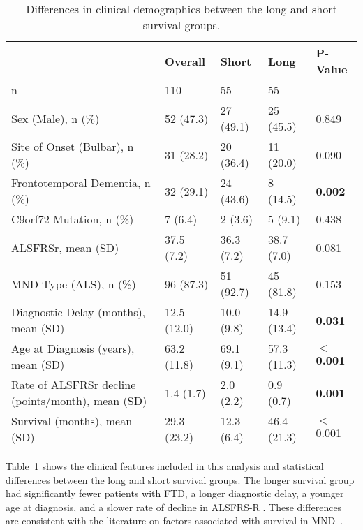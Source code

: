 \begin{table}
    \centering
    \label{tab:clinical_demographics}
    \caption{Differences in clinical demographics between the long and short survival groups.}
    \begin{tabular}{|p{5cm}|llll|}
    \hline
                                                        & \textbf{Overall}     & \textbf{Short}        & \textbf{Long}         & \textbf{P-Value}   \\
    \hline
     n                                                  & 110         & 55         & 55          &           \\ \hline
     Sex (Male), n (\%)                                     & 52 (47.3)   & 27 (49.1)  & 25 (45.5)   & 0.849     \\ \hline
     Site of Onset (Bulbar), n (\%)                          & 31 (28.2)   & 20 (36.4)  & 11 (20.0)  & 0.090     \\\hline
     Frontotemporal Dementia, n (\%)                       & 32 (29.1)   & 24 (43.6)  & 8 (14.5)   & \textbf{0.002}     \\\hline
     C9orf72 Mutation, n (\%)                               & 7 (6.4)     & 2 (3.6)    & 5 (9.1)   & 0.438     \\\hline
     ALSFRSr, mean (SD)                                  & 37.5 (7.2)  & 36.3 (7.2) & 38.7 (7.0)  & 0.081     \\\hline
     MND Type (ALS), n (\%)                                & 96 (87.3)   & 51 (92.7)  & 45 (81.8)   & 0.153     \\\hline
     Diagnostic Delay (months), mean (SD)                 & 12.5 (12.0) & 10.0 (9.8) & 14.9 (13.4) & \textbf{0.031}     \\\hline
     Age at Diagnosis (years), mean (SD)                   & 63.2 (11.8) & 69.1 (9.1) & 57.3 (11.3) & \textbf{\ensuremath{<}0.001 }   \\\hline
     Rate of ALSFRSr decline (points/month), mean (SD)       & 1.4 (1.7)   & 2.0 (2.2)  & 0.9 (0.7)   & \textbf{0.001}     \\\hline
     Survival (months), mean (SD)                         & 29.3 (23.2) & 12.3 (6.4) & 46.4 (21.3) & \ensuremath{<}0.001    \\\hline
    \end{tabular}
\end{table}

Table~\ref{tab:clinical_demographics} shows the clinical features included in this analysis and statistical differences between the long and short survival groups.
The longer survival group had significantly fewer patients with FTD, a longer diagnostic delay, a younger age at diagnosis, and a slower rate of decline in ALSFRS-R .
These differences are consistent with the literature on factors associated with survival in MND~\cite{suPredictorsSurvivalPatients2021}.

